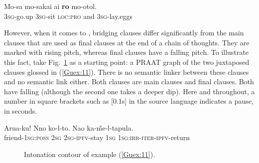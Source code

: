 \documentclass[output=paper]{LSP/langsci}
\begin{document}
\begin{exe}
\ex \label{Guex:10}
\gll Mo-sa    mo-sakai  ai \textbf{ro}  mo-otol.\\     	       
\textsc{3sg}-go.up \textsc{3sg}-sit \textsc{loc:pro}  and   \textsc{3sg}-lay.eggs\\
\glt {} \citep[][320]{guerin11}
\end{exe}

However, when it comes to , bridging clauses differ significantly from the main clauses that are used as final clauses at the end of a chain of thoughts. They are marked with rising pitch, whereas final clauses have a falling pitch. To illustrate this fact, take Fig.~\ref{GuF1} as a starting point: a PRAAT graph of the two juxtaposed clauses glossed in (\ref{Guex:11}). There is no semantic linker between these clauses and no semantic link either. Both clauses are main clauses and final clauses. Both have falling  (although the second one takes a deeper dip). Here and throughout, a number in square brackets such as [0.1s] in the source language indicates a pause, in seconds.

\begin{exe}
\ex \label{Guex:11}
\gll Arua-ku!      Nno  ko-l-to.            Nao   ka-\H{m}e-l-tapula.\\     	       
friend-\textsc{1sg:poss}   \textsc{2sg}  \textsc{2sg-ipfv-}stay \textsc{1sg}   \textsc{1sg:irr-iter-ipfv}-return \\
\glt {} 
\end{exe}

\begin{figure}[ht]
\caption{Intonation contour of example (\ref{Guex:11}). \label{GuF1}}
\end{figure}
\end{document}
